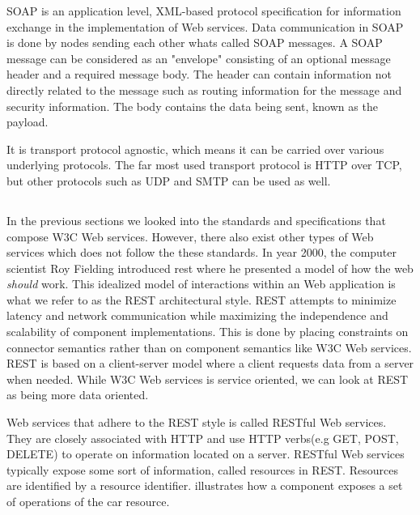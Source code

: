 SOAP is an application level, XML-based protocol specification for information
exchange\cite{w3c-soap} in the implementation of Web services. Data
communication in SOAP is done by nodes sending each other whats called SOAP
messages. A SOAP message can be considered as an "envelope" consisting of an
optional message header and a required message body. The header can contain
information not directly related to the message such as routing information for
the message and security information. The body contains the data being sent,
known as the payload.

It is transport protocol agnostic, which means it can be carried over various
underlying protocols. The far most used transport protocol is HTTP over TCP, but
other protocols such as UDP and SMTP can be used as well.

\subsection{}
\label{rest}

In the previous sections we looked into the standards and specifications that
compose W3C Web services. However, there also exist other types of Web services
which does not follow the these standards. In year 2000, the computer scientist
Roy Fielding introduced \gls{rest} where he presented a model of how the web
\textit{should} work. This idealized model of interactions within an Web
application\cite{rest-fielding} is what we refer to as the REST architectural
style. REST attempts to minimize latency and network communication while
maximizing the independence and scalability of component implementations. This
is done by placing constraints on connector semantics rather than on component
semantics like W3C Web services.  REST is based on a client-server model where a
client requests data from a server when needed. While W3C Web services is
service oriented, we can look at REST as being more data oriented.

Web services that adhere to the REST style is called RESTful Web services. They
are closely associated with HTTP and use HTTP verbs(e.g GET, POST, DELETE) to
operate on information located on a server. RESTful Web services typically
expose some sort of information, called resources in REST. Resources are
identified by a resource identifier.  illustrates how a
component exposes a set of operations of the car resource.

